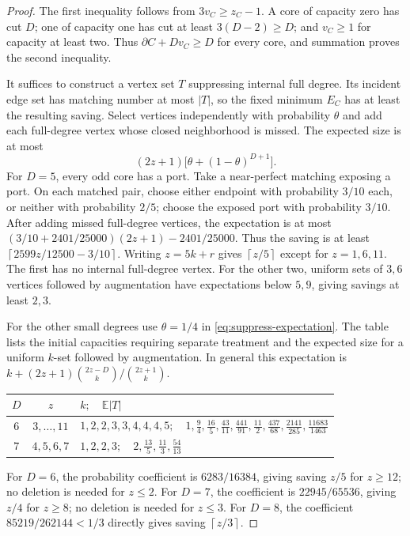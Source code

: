 \documentclass[11pt,a4paper]{article}
\newcommand{\ceil}[1]{\left\lceil#1\right\rceil}
\theoremstyle{definition}
\begin{document}
\begin{proof}
The first inequality follows from $3v_C\ge z_C-1$.
A core of capacity zero has cut $D$; one of capacity one has cut at least $3(D-2)\ge D$; and $v_C\ge1$ for capacity at least two.
Thus $\partial C+Dv_C\ge D$ for every core, and summation proves the second inequality.

It suffices to construct a vertex set $T$ suppressing internal full degree. Its incident edge set has matching number at most $|T|$, so the fixed minimum $E_C$ has at least the resulting saving.
Select vertices independently with probability $\theta$ and add each full-degree vertex whose closed neighborhood is missed. The expected size is at most
\begin{equation}\label{eq:suppress-expectation}
 (2z+1)\bigl[\theta+(1-\theta)^{D+1}\bigr].
\end{equation}
For $D=5$, every odd core has a port. Take a near-perfect matching exposing a port. On each matched pair, choose either endpoint with probability $3/10$ each, or neither with probability $2/5$; choose the exposed port with probability $3/10$.
After adding missed full-degree vertices, the expectation is at most
$(3/10+2401/25000)(2z+1)-2401/25000$.
Thus the saving is at least $\ceil{2599z/12500-3/10}$. Writing $z=5k+r$ gives $\ceil{z/5}$ except for $z=1,6,11$. The first has no internal full-degree vertex. For the other two, uniform sets of $3,6$ vertices followed by augmentation have expectations below $5,9$, giving savings at least $2,3$.

For the other small degrees use $\theta=1/4$ in \eqref{eq:suppress-expectation}.
The table lists the initial capacities requiring separate treatment and the expected size for a uniform $k$-set followed by augmentation. In general this expectation is
$k+(2z+1)\binom{2z-D}{k}/\binom{2z+1}{k}$.
\begin{center}\small
\begin{tabular}{ccP{.72\textwidth}}
\toprule
$D$&$z$& $k;\quad \mathbb E|T|$\\\midrule
$6$&$3,\ldots,11$&
$1,2,2,3,3,4,4,4,5;\quad
1,\frac94,\frac{16}5,\frac{43}{11},\frac{441}{91},\frac{11}2,
\frac{437}{68},\frac{2141}{285},\frac{11683}{1463}$\\
$7$&$4,5,6,7$&$1,2,2,3;\quad 2,\frac{13}5,\frac{11}3,\frac{54}{13}$\\
\bottomrule
\end{tabular}\end{center}

For $D=6$, the probability coefficient is $6283/16384$, giving saving $z/5$ for $z\ge12$; no deletion is needed for $z\le2$.
For $D=7$, the coefficient is $22945/65536$, giving $z/4$ for $z\ge8$; no deletion is needed for $z\le3$.
For $D=8$, the coefficient $85219/262144<1/3$ directly gives saving $\ceil{z/3}$.


\end{proof}
\end{document}
